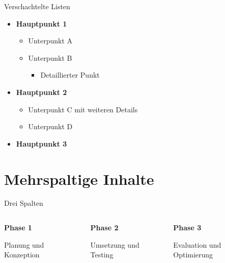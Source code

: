 \documentclass[aspectratio=169,10pt]{beamer}
\begin{document}
\begin{frame}{Verschachtelte Listen}

  \begin{itemize}
    \item \textbf{Hauptpunkt 1}
      \begin{itemize}
        \item Unterpunkt A
        \item Unterpunkt B
          \begin{itemize}
            \item Detaillierter Punkt
          \end{itemize}
      \end{itemize}
    \item \textbf{Hauptpunkt 2}
      \begin{itemize}
        \item Unterpunkt C mit weiteren Details
        \item Unterpunkt D
      \end{itemize}
    \item \textbf{Hauptpunkt 3}
  \end{itemize}
\end{frame}

\section{Mehrspaltige Inhalte}
\begin{frame}{Drei Spalten}
\begin{columns}[T]
  \begin{column}{0.3\textwidth}
    \centering
    \textbf{\textcolor{HMRed}{Phase 1}}
    
    \vspace{0.3cm}
    Planung und Konzeption
  \end{column}
  \begin{column}{0.3\textwidth}
    \centering
    \textbf{\textcolor{HMRed}{Phase 2}}
    
    \vspace{0.3cm}
    Umsetzung und Testing
  \end{column}
  \begin{column}{0.3\textwidth}
    \centering
    \textbf{\textcolor{HMRed}{Phase 3}}
    
    \vspace{0.3cm}
    Evaluation und Optimierung
  \end{column}
\end{columns}
\end{frame}
\end{document}
